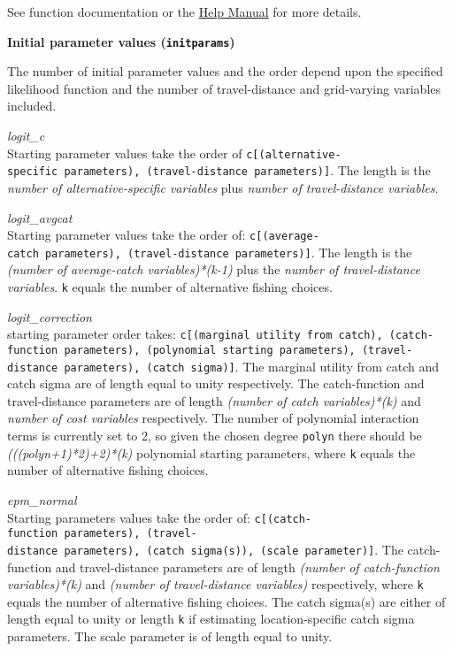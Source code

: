 \documentclass[
]{article}
\begin{document}
See function documentation or the \href{LINK!!!}{Help Manual} for more details.

\textbf{Initial parameter values (\texttt{initparams})}

The number of initial parameter values and the order depend upon the specified likelihood function and the number of travel-distance and grid-varying variables included.

\emph{logit\_c}\\
Starting parameter values take the order of \texttt{c{[}(alternative-specific\ parameters),\ (travel-distance\ parameters){]}}. The length is the \emph{number of alternative-specific variables} plus \emph{number of travel-distance variables}.

\emph{logit\_avgcat}\\
Starting parameter values take the order of: \texttt{c{[}(average-catch\ parameters),\ (travel-distance\ parameters){]}}. The length is the \emph{(number of average-catch variables)*(k-1)} plus the \emph{number of travel-distance variables}. \texttt{k} equals the number of alternative fishing choices.

\emph{logit\_correction}\\
starting parameter order takes: \texttt{c{[}(marginal\ utility\ from\ catch),\ (catch-function\ parameters),\ (polynomial\ starting\ parameters),\ (travel-distance\ parameters),\ (catch\ sigma){]}}. The marginal utility from catch and catch sigma are of length equal to unity respectively. The catch-function and travel-distance parameters are of length \emph{(number of catch variables)*(k)} and \emph{number of cost variables} respectively. The number of polynomial interaction terms is currently set to 2, so given the chosen degree \texttt{polyn} there should be \emph{(((polyn+1)*2)+2)*(k)} polynomial starting parameters, where \texttt{k} equals the number of alternative fishing choices.

\emph{epm\_normal}\\
Starting parameters values take the order of: \texttt{c{[}(catch-function\ parameters),\ (travel-distance\ parameters),\ (catch\ sigma(s)),\ (scale\ parameter){]}}. The catch-function and travel-distance parameters are of length \emph{(number of catch-function variables)*(k)} and \emph{(number of travel-distance variables)} respectively, where \texttt{k} equals the number of alternative fishing choices. The catch sigma(s) are either of length equal to unity or length \texttt{k} if estimating location-specific catch sigma parameters. The scale parameter is of length equal to unity.
\end{document}
